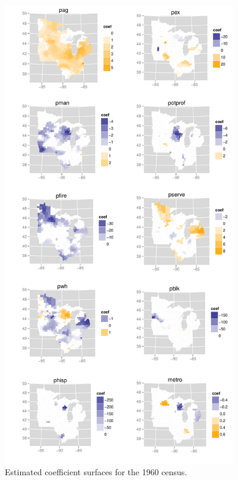 \documentclass[authoryear, review, 11pt]{elsarticle}
\begin{document}
	\begin{figure}
		\begin{center}
			\includegraphics[height=8in]{../../figures/poverty/1960.linear.coefficients.pdf}
			\caption{Estimated coefficient surfaces for the 1960 census.\label{fig:census-coefs-1960}}
		\end{center}		
	\end{figure}
\end{document}
